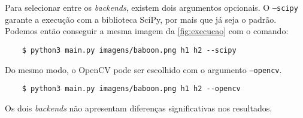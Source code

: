 Para selecionar entre os \textit{backends}, existem dois argumentos opcionais. O \texttt{--scipy} garante a execução com a biblioteca SciPy, por mais que já seja o padrão. Podemos então conseguir a mesma imagem da \cref{fig:execucao} com o comando:

\begin{verbatim}
    $ python3 main.py imagens/baboon.png h1 h2 --scipy
\end{verbatim}

Do mesmo modo, o OpenCV pode ser escolhido com o argumento \texttt{--opencv}.

\begin{verbatim}
    $ python3 main.py imagens/baboon.png h1 h2 --opencv
\end{verbatim}

Os dois \textit{backends} não apresentam diferenças significativas nos resultados.

